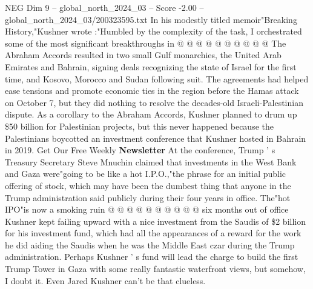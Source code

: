 \begin{textsample}{NEG Dim 9 – global\_north\_2024\_03 – Score -2.00 – global\_north\_2024\_03/200323595.txt}
In his modestly titled memoir"Breaking History,"Kushner wrote :"Humbled by the complexity of the task, I orchestrated some of the most significant breakthroughs in @ @ @ @ @ @ @ @ @ @ The Abraham Accords resulted in two small Gulf monarchies, the United Arab Emirates and Bahrain, signing deals recognizing the state of Israel for the first time, and Kosovo, Morocco and Sudan following suit.
The agreements had helped ease tensions and promote economic ties in the region before the Hamas attack on October 7, but they did nothing to resolve the decades-old Israeli-Palestinian dispute.
As a corollary to the Abraham Accords, Kushner planned to drum up \$50 billion for Palestinian projects, but this never happened because the Palestinians boycotted an investment conference that Kushner hosted in Bahrain in 2019.
Get Our Free Weekly \textbf{Newsletter} At the conference, Trump ' s Treasury Secretary Steve Mnuchin claimed that investments in the West Bank and Gaza were"going to be like a hot I.P.O.,"the phrase for an initial public offering of stock, which may have been the dumbest thing that anyone in the Trump administration said publicly during their four years in office.
The"hot IPO"is now a smoking ruin @ @ @ @ @ @ @ @ @ @ six months out of office Kushner kept failing upward with a nice investment from the Saudis of \$2 billion for his investment fund, which had all the appearances of a reward for the work he did aiding the Saudis when he was the Middle East czar during the Trump administration.
Perhaps Kushner ' s fund will lead the charge to build the first Trump Tower in Gaza with some really fantastic waterfront views, but somehow, I doubt it.
Even Jared Kushner can't be that clueless.

\end{textsample}
